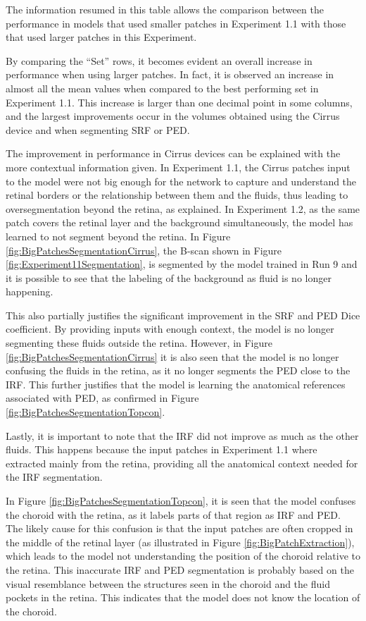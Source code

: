 The information resumed in this table allows the comparison between the performance in models that used smaller patches in Experiment 1.1 with those that used larger patches in this Experiment.
\par
By comparing the ``Set'' rows, it becomes evident an overall increase in performance when using larger patches. In fact, it is observed an increase in almost all the mean values when compared to the best performing set in Experiment 1.1. This increase is larger than one decimal point in some columns, and the largest improvements occur in the volumes obtained using the Cirrus device and when segmenting SRF or PED.
\par
The improvement in performance in Cirrus devices can be explained with the more contextual information given. In Experiment 1.1, the Cirrus patches input to the model were not big enough for the network to capture and understand the retinal borders or the relationship between them and the fluids, thus leading to oversegmentation beyond the retina, as explained. In Experiment 1.2, as the same patch covers the retinal layer and the background simultaneously, the model has learned to not segment beyond the retina. In Figure \ref{fig:BigPatchesSegmentationCirrus}, the B-scan shown in Figure \ref{fig:Experiment11Segmentation}, is segmented by the model trained in Run 9 and it is possible to see that the labeling of the background as fluid is no longer happening.
\par 
This also partially justifies the significant improvement in the SRF and PED Dice coefficient. By providing inputs with enough context, the model is no longer segmenting these fluids outside the retina. However, in Figure \ref{fig:BigPatchesSegmentationCirrus} it is also seen that the model is no longer confusing the fluids in the retina, as it no longer segments the PED close to the IRF. This further justifies that the model is learning the anatomical references associated with PED, as confirmed in Figure \ref{fig:BigPatchesSegmentationTopcon}.
\par
Lastly, it is important to note that the IRF did not improve as much as the other fluids. This happens because the input patches in Experiment 1.1 where extracted mainly from the retina, providing all the anatomical context needed for the IRF segmentation.
\par
In Figure \ref{fig:BigPatchesSegmentationTopcon}, it is seen that the model confuses the choroid with the retina, as it labels parts of that region as IRF and PED. The likely cause for this confusion is that the input patches are often cropped in the middle of the retinal layer (as illustrated in Figure \ref{fig:BigPatchExtraction}), which leads to the model not understanding the position of the choroid relative to the retina. This inaccurate IRF and PED segmentation is probably based on the visual resemblance between the structures seen in the choroid and the fluid pockets in the retina. This indicates that the model does not know the location of the choroid.

